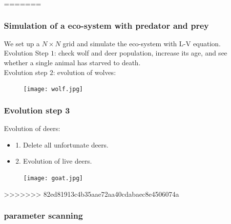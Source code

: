 \documentclass{beamer}
\begin{document}
=======
\frame
{
  \frametitle{Simulation of a eco-system with predator and prey}
  We set up a $N \times N$ grid and simulate the eco-system with L-V equation. \\
  Evolution Step $1$: check wolf and deer population, increase its age, and see whether a single animal has starved to death. \\
  Evolution step $2$: evolution of wolves: \\
  \begin{figure}[htb]
  \begin{center}
  \texttt{[image: wolf.jpg]}
  \label{default}
  \end{center}
  \end{figure}
}
\frame
{
  \frametitle{Evolution step 3}
  Evolution of deers: \\
  \begin{itemize}
  \item 1. Delete all unfortunate deers. \\
  \pause
  \item 2. Evolution of live deers. \\
  \end{itemize}
  \begin{figure}[htbp]
  \begin{center}
  \texttt{[image: goat.jpg]}
  \label{default}
  \end{center}
  \end{figure}
}
>>>>>>> 82ed81913c4b35aae72aa40cdabaec8e4506074a
\frame
{
  \frametitle{parameter scanning}
  
}
\end{document}
